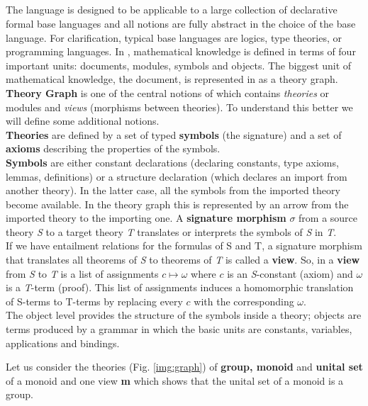 \subsection{\omdmmt}

The \mmt language \cite{Rabe:MMTLanguageSystem09} is designed to be applicable to a large collection of declarative
formal base languages and all  \mmt notions are fully abstract in the choice of the base language. For clarification,
 typical base languages are logics, type theories, or programming languages. In \mmt, mathematical knowledge is
 defined in terms of four important
units: documents, modules, symbols and objects. The biggest unit of mathematical knowledge, the document, is
represented in  \mmt as a theory graph.
\textbf{Theory Graph} is one of the central notions of  \mmt which contains \emph{theories} or modules and
\emph{views} (morphisms between theories). To understand this better we will define some additional notions. \\
\textbf{Theories} are defined by a set of typed \textbf{symbols} (the signature) and a set of \textbf{axioms}
describing the properties of the symbols. \\
\textbf{Symbols} are either constant declarations (declaring constants, type axioms, lemmas, definitions) or a
structure declaration (which declares an import from another theory). In the latter case, all the symbols from the
imported theory become available. In the theory graph this is represented by an arrow from the imported theory to the importing one.
A \textbf{signature morphism} $\sigma$ from a source theory \emph{S} to a target theory \emph{T} translates or
interprets the symbols of \emph{S} in \emph{T}. \\
If we have entailment relations for the formulas of S and T, a signature morphism that translates all theorems of
\emph{S} to theorems of \emph{T} is called a \textbf{view}. So, in  \mmt a \textbf{view} from \emph{S} to \emph{T} is
 a list of assignments $c \mapsto \omega$ where $c$ is an \emph{S}-constant (axiom) and $\omega$ is a \emph{T}-term
 (proof). This list of assignments induces a homomorphic translation of S-terms to T-terms by replacing every $c$
 with the corresponding $\omega$.   \\
The object level provides the structure of the symbols inside a theory; objects are terms
produced by a grammar in which the basic units are constants, variables, applications and bindings. 

Let us consider the theories (Fig. \ref{img:graph}) of \textbf{group, monoid} and \textbf{unital set} of a monoid and
 one view \textbf{m} which shows that the unital set of a monoid is a group.

